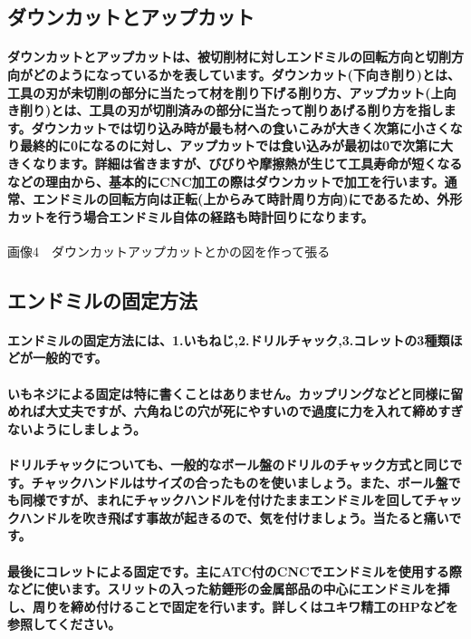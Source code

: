 \documentclass[b5paper, 9pt, twocolumn, titlepage]{jsbook}%
\begin{document}
\subsection{ダウンカットとアップカット}

\paragraph{ダウンカットとアップカットは、被切削材に対しエンドミルの回転方向と切削方向がどのようになっているかを表しています。ダウンカット(下向き削り)とは、工具の刃が未切削の部分に当たって材を削り下げる削り方、アップカット(上向き削り)とは、工具の刃が切削済みの部分に当たって削りあげる削り方を指します。ダウンカットでは切り込み時が最も材への食いこみが大きく次第に小さくなり最終的に0になるのに対し、アップカットでは食い込みが最初は0で次第に大きくなります。詳細は省きますが、びびりや摩擦熱が生じて工具寿命が短くなるなどの理由から、基本的にCNC加工の際はダウンカットで加工を行います。通常、エンドミルの回転方向は正転(上からみて時計周り方向)にであるため、外形カットを行う場合エンドミル自体の経路も時計回りになります。}


画像4　ダウンカットアップカットとかの図を作って張る

\subsection{エンドミルの固定方法}

\paragraph{エンドミルの固定方法には、1.いもねじ,2.ドリルチャック,3.コレットの3種類ほどが一般的です。}
\paragraph{いもネジによる固定は特に書くことはありません。カップリングなどと同様に留めれば大丈夫ですが、六角ねじの穴が死にやすいので過度に力を入れて締めすぎないようにしましょう。}
\paragraph{ドリルチャックについても、一般的なボール盤のドリルのチャック方式と同じです。チャックハンドルはサイズの合ったものを使いましょう。また、ボール盤でも同様ですが、まれにチャックハンドルを付けたままエンドミルを回してチャックハンドルを吹き飛ばす事故が起きるので、気を付けましょう。当たると痛いです。}
\paragraph{最後にコレットによる固定です。主にATC付のCNCでエンドミルを使用する際などに使います。スリットの入った紡錘形の金属部品の中心にエンドミルを挿し、周りを締め付けることで固定を行います。詳しくはユキワ精工のHPなどを参照してください。}
\end{document}
